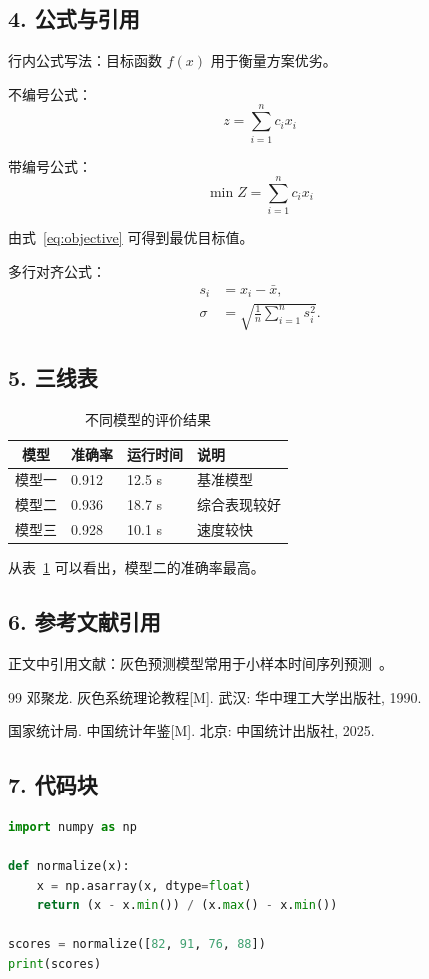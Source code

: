 \subsection*{4. 公式与引用}
\begin{tcode}
行内公式写法：目标函数 $f(x)$ 用于衡量方案优劣。

不编号公式：
\[
  z = \sum_{i=1}^{n} c_i x_i
\]

带编号公式：
\begin{equation}
  \min Z = \sum_{i=1}^{n} c_i x_i
  \label{eq:objective}
\end{equation}

由式~\cref{eq:objective} 可得到最优目标值。

多行对齐公式：
\begin{align}
  s_i &= x_i - \bar{x},\\
  \sigma &= \sqrt{\frac{1}{n}\sum_{i=1}^{n}s_i^2}.
\end{align}
\end{tcode}

\subsection*{5. 三线表}
\begin{tcode}
\begin{table}[!htbp]
  \centering
  \caption{不同模型的评价结果}
  \label{tab:model-compare}
  \begin{tabularx}{\textwidth}{cXXX}
    \toprule
    模型 & 准确率 & 运行时间 & 说明 \\
    \midrule
    模型一 & 0.912 & 12.5 s & 基准模型 \\
    模型二 & 0.936 & 18.7 s & 综合表现较好 \\
    模型三 & 0.928 & 10.1 s & 速度较快 \\
    \bottomrule
  \end{tabularx}
\end{table}

从表~\cref{tab:model-compare} 可以看出，模型二的准确率最高。
\end{tcode}

\subsection*{6. 参考文献引用}
\begin{tcode}
正文中引用文献：灰色预测模型常用于小样本时间序列预测~\cite{ref:grey}。

\begin{thebibliography}{99}
  邓聚龙. 灰色系统理论教程[M]. 武汉: 华中理工大学出版社, 1990.

  国家统计局. 中国统计年鉴[M]. 北京: 中国统计出版社, 2025.
\end{thebibliography}
\end{tcode}

\subsection*{7. 代码块}
\begin{tcode}
\begin{lstlisting}[language=Python]
import numpy as np

def normalize(x):
    x = np.asarray(x, dtype=float)
    return (x - x.min()) / (x.max() - x.min())

scores = normalize([82, 91, 76, 88])
print(scores)
\end{lstlisting}
\end{tcode}
